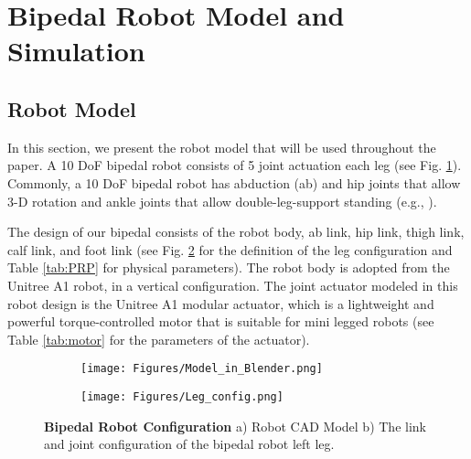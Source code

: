 
\section{Bipedal Robot Model and Simulation}
\label{sec:robotModel}

\subsection{Robot Model}
\label{subsec:robotModel}

In this section, we present the robot model that will be used throughout the paper. A 10 DoF bipedal robot consists of 5 joint actuation each leg (see Fig. \ref{fig:robotModel}). Commonly, a 10 DoF bipedal robot has abduction (ab) and hip joints that allow 3-D rotation and ankle joints that allow double-leg-support standing (e.g., \cite{levineblackbird,gong2019feedback}). 

The design of our bipedal consists of the robot body, ab link, hip link, thigh link, calf link, and foot link (see Fig. \ref{fig:legConfig} for the definition of the leg configuration and Table \ref{tab:PRP} for physical parameters). The robot body is adopted from the Unitree A1 robot, in a vertical configuration. The joint actuator modeled in this robot design is the Unitree A1 modular actuator, which is a lightweight and powerful torque-controlled motor that is suitable for mini legged robots (see Table \ref{tab:motor} for the parameters of the actuator). 
\begin{figure}[!h]
	\hspace{0.2cm}
     \center
     \begin{subfigure}[b]{0.227\textwidth}
         \centering
         \texttt{[image: Figures/Model\_in\_Blender.png]}
         \caption{ }
         \label{fig:robotModel}
     \end{subfigure}
     \begin{subfigure}[b]{0.21\textwidth}
         \centering
         \texttt{[image: Figures/Leg\_config.png]}
         \caption{ }
         \label{fig:legConfig}
     \end{subfigure}
        \caption{{\bfseries Bipedal Robot Configuration}  a) Robot CAD Model  b) The link and joint configuration of the bipedal robot left leg.}
        \label{fig:robotConfig}
\end{figure}


